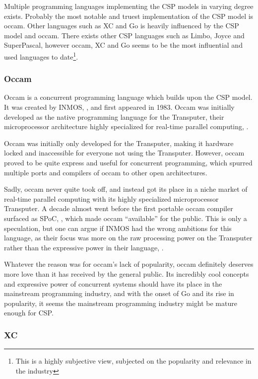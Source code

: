 Multiple programming languages implementing the CSP models in varying degree exists. Probably the most notable and truest implementation of the CSP model is occam. Other languages such as XC and Go is heavily influenced by the CSP model and occam. There exists other CSP languages such as Limbo, Joyce and SuperPascal, however occam, XC and Go seems to be the most influential and used languages to date\footnote{This is a highly subjective view, subjected on the popularity and relevance in the industry}. 


\subsubsection{Occam}
\label{sssec:occam}

Occam is a concurrent programming language which builds upon the CSP model. It was created by INMOS, \citet{occam83}, and first appeared in 1983. Occam was initially developed as the native programming language for the Transputer, their microprocessor architecture highly specialized for real-time parallel computing, \citet{transputer78}. 

Occam was initially only developed for the Transputer, making it hardware locked and inaccessible for everyone not using the Transputer. However, occam proved to be quite express and useful for concurrent programming, which spurred multiple ports and compilers of occam to other open architectures. 

Sadly, occam never quite took off, and instead got its place in a niche market of real-time parallel computing with its highly specialized microprocessor Transputer. A decade almost went before the first portable occam compiler surfaced as SPoC, \citet{wykesdebbage1994}, which made occam ``available'' for the public. This is only a speculation, but one can argue if INMOS had the wrong ambitions for this language, as their focus was more on the raw processing power on the Transputer rather than the expressive power in their language, \citet{occam83}. 

Whatever the reason was for occam's lack of popularity, occam definitely deserves more love than it has received by the general public. Its incredibly cool concepts and expressive power of concurrent systems should have its place in the mainstream programming industry, and with the onset of Go and its rise in popularity, it seems the mainstream programming industry might be mature enough for CSP.


\subsubsection{XC}
\label{sssec:xc}

